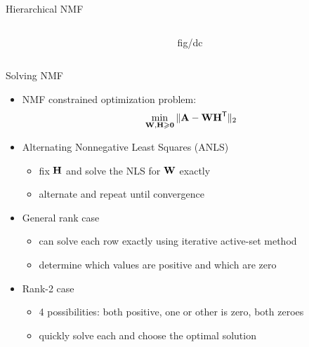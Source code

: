 \documentclass{beamer}
\begin{document}
\begin{frame}{Hierarchical NMF}
\begin{columns}
\begin{column}{.4\textwidth}
\end{column}
\begin{column}{.6\textwidth}
	\begin{adjustbox}{width=\textwidth}
    		{fig/dc}
   	\end{adjustbox}
\end{column}
\end{columns}

\end{frame}

\begin{frame}{Solving NMF}
    \begin{itemize}
        \item NMF constrained optimization problem: $$\min_{\M{W},\M{H}\geq \M{0}} \|\M{A} - \M{W}\M{H}^\Tra\|_2$$
        
        \vfill
        
        \item Alternating Nonnegative Least Squares (ANLS)
        \begin{itemize}
            \item fix $\M{H}$ and solve the NLS for $\M{W}$ exactly
            \item alternate and repeat until convergence
        \end{itemize}
        
        \vfill

        \item General rank case
        \begin{itemize}
            \item can solve each row exactly using iterative active-set method
            \item determine which values are positive and which are zero
        \end{itemize}
        
        \vfill
        
         \item Rank-2 case
        \begin{itemize}
            \item 4 possibilities: both positive, one or other is zero, both zeroes 
            \item quickly solve each and choose the optimal solution
        \end{itemize}
    \end{itemize}
\end{frame}
\end{document}
